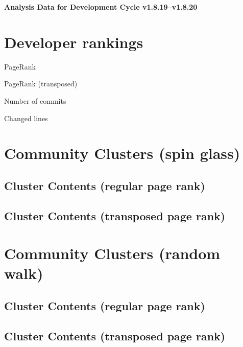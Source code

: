 \documentclass{article}
\begin{document}
\setlength{\parindent}{0pt}
\begin{center}
\begin{Large}
\textbf{Analysis Data for Development Cycle v1.8.19--v1.8.20}
\end{Large}
\end{center}
\section{Developer rankings}
\begin{small}\renewcommand{\tabcolsep}{1pt}
\begin{minipage}{0.5\linewidth}
PageRank\\

\end{minipage}%
\begin{minipage}{0.5\linewidth}
PageRank (transposed)\\

\end{minipage}

\renewcommand{\tabcolsep}{5pt}
\begin{minipage}{0.5\linewidth}
Number of commits\\

\end{minipage}%
\begin{minipage}{0.5\linewidth}
Changed lines\\

\end{minipage}
\end{small}
\newpage\section{Community Clusters (spin glass)}
\subsection{Cluster Contents (regular page rank)}
\newpage\subsection{Cluster Contents (transposed page rank)}
\newpage\section{Community Clusters (random walk)}
\subsection{Cluster Contents (regular page rank)}
\newpage\subsection{Cluster Contents (transposed page rank)}
\end{document}
